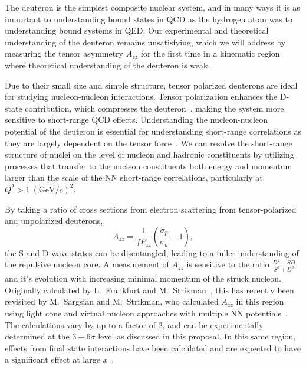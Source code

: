 
The deuteron is the simplest composite nuclear system, and in many ways it is as important to understanding bound states in QCD as the hydrogen atom was to understanding bound systems in QED.  Our experimental and theoretical understanding of the deuteron remains unsatisfying, which we will address by measuring the tensor asymmetry $A_{zz}$ for the first time in a kinematic region where theoretical understanding of the deuteron is weak.

Due to their small size and simple structure, tensor polarized deuterons are ideal for studying nucleon-nucleon interactions. Tensor polarization enhances the D-state contribution, which compresses the deuteron~\cite{Forest:1996kp}, 
making the system more sensitive to short-range QCD effects. Understanding the nucleon-nucleon potential of the deuteron is essential for understanding short-range correlations as they are largely dependent on the tensor force~\cite{Arrington:2011xs}. We can resolve the short-range structure of nuclei on the level of nucleon and hadronic constituents by utilizing processes that transfer to the nucleon constituents both energy and momentum larger than the scale of the NN short-range correlations, particularly at $Q^2>1~(\mathrm{GeV}/c)^2$.


By taking a ratio of cross sections from electron scattering from tensor-polarized and unpolarized deuterons, 
\begin{equation}
A_{zz}=\frac{1}{fP_{zz}}\left(\frac{\sigma_p}{\sigma_u}-1\right),
\end{equation}
the S and D-wave states can be disentangled, leading to a fuller understanding of the repulsive nucleon core. A measurement of $A_{zz}$ is sensitive to the ratio $\frac{D^2-SD}{S^2+D^2}$ and it's evolution with increasing minimal momentum of the struck nucleon. Originally calculated by L.~Frankfurt and M.~Strikman~\cite{Frankfurt:1988nt}, this has recently been revisited by M.~Sargsian and M.~Strikman, who calculated $A_{zz}$ in this region using light cone and virtual nucleon approaches with multiple NN potentials~\cite{Sargsian:2014fla}. The calculations vary by up to a factor of 2, and can be experimentally determined at the $3-6\sigma$ level as discussed in this proposal. In this same region, effects from final state interactions have been calculated and are expected to have a significant effect at large $x$~\cite{cosyn-convo}.


